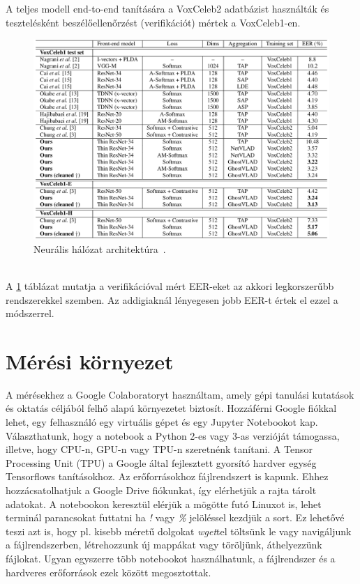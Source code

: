 A teljes modell end-to-end tanítására a VoxCeleb2 adatbázist használták és tesztelésként beszélőellenőrzést (verifikációt) mértek a VoxCeleb1-en.
\begin{figure}[!ht]
	\centering
	\includegraphics[width=150mm, keepaspectratio]{figures/frame-cnn-results.png}
	\caption{Neurális hálózat architektúra~\cite{speaker_in_the_wild}.}
	\label{fig:frame-cnn-results}
\end{figure}
\ \\
A \ref{fig:frame-cnn-results} táblázat mutatja a verifikációval mért EER-eket az akkori legkorszerűbb rendszerekkel szemben. Az addigiaknál lényegesen jobb EER-t értek el ezzel a módszerrel.

\section{Mérési környezet}

A mérésekhez a Google Colaboratoryt használtam, amely gépi tanulási kutatások és oktatás céljából felhő alapú környezetet biztosít. Hozzáférni Google fiókkal lehet, egy felhasználó egy virtuális gépet és egy Jupyter Notebookot kap. Választhatunk, hogy  a notebook a Python 2-es vagy 3-as verzióját támogassa, illetve, hogy CPU-n, GPU-n vagy TPU-n szeretnénk tanítani. A Tensor Processing Unit (TPU) a Google által fejlesztett gyorsító hardver egység Tensorflows tanításokhoz.
\newline
\newline
Az erőforrásokhoz fájlrendszert is kapunk. Ehhez hozzácsatolhatjuk a Google Drive fiókunkat, így elérhetjük a rajta tárolt adatokat. A notebookon keresztül elérjük a mögötte futó Linuxot is, lehet terminál parancsokat futtatni ha \emph{!} vagy \emph{\%} jelöléssel kezdjük a sort. Ez lehetővé teszi azt is, hogy pl. kisebb méretű dolgokat \emph{wget}tel töltsünk le vagy navigáljunk a fájlrendszerben, létrehozzunk új mappákat vagy töröljünk, áthelyezzünk fájlokat. Ugyan egyszerre több notebookot használhatunk, a fájlrendszer és a hardveres erőforrások ezek között megosztottak.

